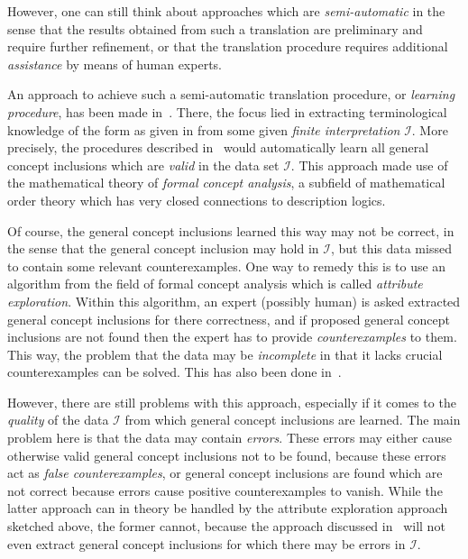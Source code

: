 However, one can still think about approaches which are \emph{semi-automatic} in the sense
that the results obtained from such a translation are preliminary and require further
refinement, or that the translation procedure requires additional \emph{assistance} by
means of human experts.

An approach to achieve such a semi-automatic translation procedure, or \emph{learning
  procedure}, has been made in~\cite{Diss-Felix}.  There, the focus lied in extracting
terminological knowledge of the form as given in  from some given \emph{finite
  interpretation} $\mathcal{I}$.  More precisely, the procedures described
in~\cite{Diss-Felix} would automatically learn all general concept inclusions which are
\emph{valid} in the data set $\mathcal{I}$.  This approach made use of the mathematical
theory of \emph{formal concept analysis}, a subfield of mathematical order theory which
has very closed connections to description logics.

Of course, the general concept inclusions learned this way may not be correct, in the
sense that the general concept inclusion may hold in $\mathcal{I}$, but this data missed
to contain some relevant counterexamples.  One way to remedy this is to use an algorithm
from the field of formal concept analysis which is called \emph{attribute exploration}.
Within this algorithm, an expert (possibly human) is asked extracted general concept
inclusions for there correctness, and if proposed general concept inclusions are not found
then the expert has to provide \emph{counterexamples} to them.  This way, the problem that
the data may be \emph{incomplete} in that it lacks crucial counterexamples can be solved.
This has also been done in~\cite{Diss-Felix}.

However, there are still problems with this approach, especially if it comes to the
\emph{quality} of the data $\mathcal{I}$ from which general concept inclusions are
learned.  The main problem here is that the data may contain \emph{errors}.  These errors
may either cause otherwise valid general concept inclusions not to be found, because these
errors act as \emph{false counterexamples}, or general concept inclusions are found which
are not correct because errors cause positive counterexamples to vanish.  While the latter
approach can in theory be handled by the attribute exploration approach sketched above,
the former cannot, because the approach discussed in~\cite{Diss-Felix} will not even
extract general concept inclusions for which there may be errors in $\mathcal{I}$.

